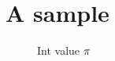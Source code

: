 \documentclass{article}
\begin{document}
\section{A sample}\label{Sample-doc}

\begin{figure}[htbp]
    \caption{Int value \protect\( \pi \protect\)}
    \label{fig:pi}
\end{figure}
\end{document}
